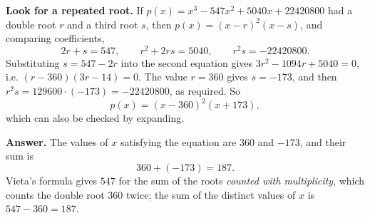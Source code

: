 \textbf{Look for a repeated root.} If $p(x)=x^3-547x^2+5040x+22420800$ had a double root $r$ and a third root $s$, then $p(x)=(x-r)^2(x-s)$, and comparing coefficients,
\[2r+s=547,\qquad r^2+2rs=5040,\qquad r^2s=-22420800.\]
Substituting $s=547-2r$ into the second equation gives $3r^2-1094r+5040=0$, i.e. $(r-360)(3r-14)=0$. The value $r=360$ gives $s=-173$, and then $r^2s=129600\cdot(-173)=-22420800$, as required. So
\[p(x)=(x-360)^2(x+173),\]
which can also be checked by expanding.

\textbf{Answer.} The values of $x$ satisfying the equation are $360$ and $-173$, and their sum is
\[360+(-173)=\boxed{187}.\]
Vieta's formula gives $547$ for the sum of the roots \emph{counted with multiplicity}, which counts the double root $360$ twice; the sum of the distinct values of $x$ is $547-360=187$.
